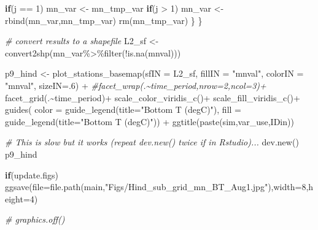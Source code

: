 \documentclass[
]{article}
\newenvironment{Shaded}{\begin{snugshade}}{\end{snugshade}}
\newcommand{\AttributeTok}[1]{\textcolor[rgb]{0.77,0.63,0.00}{#1}}
\newcommand{\CommentTok}[1]{\textcolor[rgb]{0.56,0.35,0.01}{\textit{#1}}}
\newcommand{\ControlFlowTok}[1]{\textcolor[rgb]{0.13,0.29,0.53}{\textbf{#1}}}
\newcommand{\DecValTok}[1]{\textcolor[rgb]{0.00,0.00,0.81}{#1}}
\newcommand{\FunctionTok}[1]{\textcolor[rgb]{0.00,0.00,0.00}{#1}}
\newcommand{\NormalTok}[1]{#1}
\newcommand{\OtherTok}[1]{\textcolor[rgb]{0.56,0.35,0.01}{#1}}
\newcommand{\SpecialCharTok}[1]{\textcolor[rgb]{0.00,0.00,0.00}{#1}}
\newcommand{\StringTok}[1]{\textcolor[rgb]{0.31,0.60,0.02}{#1}}
\begin{document}
\begin{Shaded}
\begin{Highlighting}[]
      \ControlFlowTok{if}\NormalTok{(j }\SpecialCharTok{==} \DecValTok{1}\NormalTok{) mn\_var }\OtherTok{\textless{}{-}}\NormalTok{ mn\_tmp\_var}
      \ControlFlowTok{if}\NormalTok{(j }\SpecialCharTok{\textgreater{}}  \DecValTok{1}\NormalTok{) mn\_var }\OtherTok{\textless{}{-}} \FunctionTok{rbind}\NormalTok{(mn\_var,mn\_tmp\_var)}
       \FunctionTok{rm}\NormalTok{(mn\_tmp\_var)}
\NormalTok{      \}}
\NormalTok{    \}}
    
    \CommentTok{\# convert results to a shapefile}
\NormalTok{    L2\_sf  }\OtherTok{\textless{}{-}} \FunctionTok{convert2shp}\NormalTok{(mn\_var}\SpecialCharTok{\%\textgreater{}\%}\FunctionTok{filter}\NormalTok{(}\SpecialCharTok{!}\FunctionTok{is.na}\NormalTok{(mnval)))}
    
\NormalTok{    p9\_hind     }\OtherTok{\textless{}{-}} \FunctionTok{plot\_stations\_basemap}\NormalTok{(}\AttributeTok{sfIN =}\NormalTok{ L2\_sf,}
                                \AttributeTok{fillIN =} \StringTok{"mnval"}\NormalTok{,}
                                \AttributeTok{colorIN =} \StringTok{"mnval"}\NormalTok{,}
                                \AttributeTok{sizeIN=}\NormalTok{.}\DecValTok{6}\NormalTok{) }\SpecialCharTok{+}
      \CommentTok{\#facet\_wrap(.\textasciitilde{}time\_period,nrow=2,ncol=3)+}
      \FunctionTok{facet\_grid}\NormalTok{(.}\SpecialCharTok{\textasciitilde{}}\NormalTok{time\_period)}\SpecialCharTok{+}
      \FunctionTok{scale\_color\_viridis\_c}\NormalTok{()}\SpecialCharTok{+}
      \FunctionTok{scale\_fill\_viridis\_c}\NormalTok{()}\SpecialCharTok{+}
      \FunctionTok{guides}\NormalTok{(}
        \AttributeTok{color =}  \FunctionTok{guide\_legend}\NormalTok{(}\AttributeTok{title=}\StringTok{"Bottom T (degC)"}\NormalTok{),}
        \AttributeTok{fill  =}  \FunctionTok{guide\_legend}\NormalTok{(}\AttributeTok{title=}\StringTok{"Bottom T (degC)"}\NormalTok{)) }\SpecialCharTok{+}
      \FunctionTok{ggtitle}\NormalTok{(}\FunctionTok{paste}\NormalTok{(sim,var\_use,IDin))}
   
    \CommentTok{\# This is slow but it works (repeat dev.new() twice if in Rstudio)...}
    \FunctionTok{dev.new}\NormalTok{()}
\NormalTok{    p9\_hind}
    
    \ControlFlowTok{if}\NormalTok{(update.figs)  }
      \FunctionTok{ggsave}\NormalTok{(}\AttributeTok{file=}\FunctionTok{file.path}\NormalTok{(main,}\StringTok{"Figs/Hind\_sub\_grid\_mn\_BT\_Aug1.jpg"}\NormalTok{),}\AttributeTok{width=}\DecValTok{8}\NormalTok{,}\AttributeTok{height=}\DecValTok{4}\NormalTok{)}
  
    \CommentTok{\# graphics.off()}
\end{Highlighting}
\end{Shaded}
\end{document}
